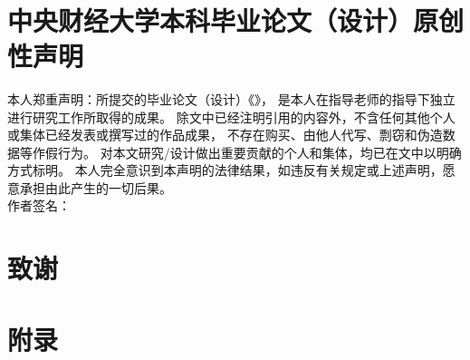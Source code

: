 \documentclass[a4paper,12pt]{report}
\begin{document}
\thispagestyle{plain}
\setcounter{page}{1}
\begin{spacing}{1.375} %
\tableofcontents %
\end{spacing}
\newpage
\begin{center}
    \textbf{}
    \\[12pt]
\end{center}
\thispagestyle{plain}
\setcounter{page}{1}






\printbibliography
\newpage
\chapter*{中央财经大学本科毕业论文（设计）原创性声明}
\vspace{1mm}
本人郑重声明：所提交的毕业论文（设计）《\MYTITLE》，
是本人在指导老师的指导下独立进行研究工作所取得的成果。
除文中已经注明引用的内容外，不含任何其他个人或集体已经发表或撰写过的作品成果，
不存在购买、由他人代写、剽窃和伪造数据等作假行为。
对本文研究/设计做出重要贡献的个人和集体，均已在文中以明确方式标明。
本人完全意识到本声明的法律结果，如违反有关规定或上述声明，愿意承担由此产生的一切后果。
\\[50pt]
作者签名：\\

\newpage
\chapter*{致谢}

\newpage
\chapter*{附录}
\end{document}
